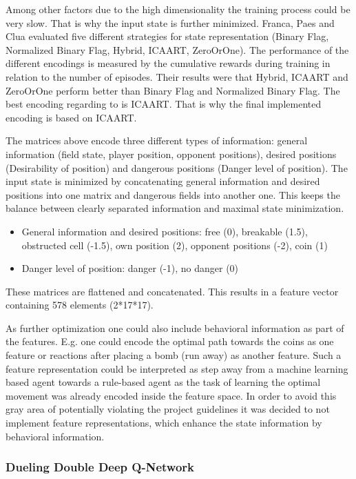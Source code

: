 Among other factors due to the high dimensionality the training process could be very slow. That is why the input state is further minimized.
Franca, Paes and Clua \cite{Franca2019} evaluated five different strategies for state representation (Binary Flag, Normalized Binary Flag, Hybrid, ICAART, ZeroOrOne). The performance of the different encodings is measured by the cumulative rewards during training in relation to the number of episodes. Their results were that Hybrid, ICAART and ZeroOrOne perform better than Binary Flag and Normalized Binary Flag. The best encoding regarding to \cite{Franca2019} is ICAART. That is why the final implemented encoding is based on ICAART.

The matrices above encode three different types of information:
general information (field state, player position, opponent positions), desired positions (Desirability of position) and dangerous positions (Danger level of position).
The input state is minimized by concatenating general information and desired positions into one matrix and dangerous fields into another one. This keeps the balance between clearly separated information and maximal state minimization.

\begin{itemize}
	\item General information and desired positions: free (0), breakable (1.5), obstructed cell (-1.5), own position (2), opponent positions (-2), coin (1)
	\item Danger level of position: danger (-1), no danger (0)
\end{itemize}
These matrices are flattened and concatenated. This results in a feature vector containing 578 elements (2*17*17).

As further optimization one could also include behavioral information as part of the features. E.g. one could encode the optimal path towards the coins as one feature or reactions after placing a bomb (run away) as another feature. Such a feature representation could be interpreted as step away from a machine learning based agent towards a rule-based agent as the task of learning the optimal movement was already encoded inside the feature space. In order to avoid this gray area of potentially violating the project guidelines it was decided to not implement feature representations, which enhance the state information by behavioral information.

\subsubsection{Dueling Double Deep Q-Network}
\label{ch:approachAb}

